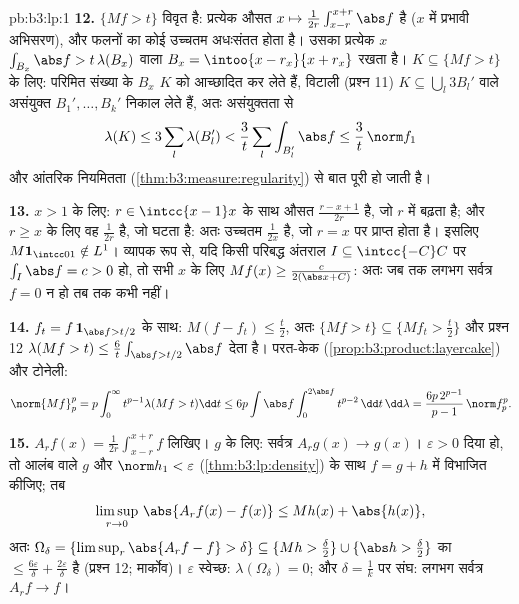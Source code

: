 \begin{solution}{pb:b3:lp:1}
\textbf{12.} $\{Mf > t\}$ विवृत है: प्रत्येक औसत $x \mapsto
\frac1{2r}\int_{x-r}^{x+r}\abs f$  है ($x$ में
प्रभावी अभिसरण), और  फलनों का कोई उच्चतम अधःसंतत होता है। उसका
प्रत्येक $x$ $\int_{B_x}\abs f >
t\,\lambda(B_x)$ वाला $B_x =
\intoo{x-r_x}{x+r_x}$ रखता है।  $K \subseteq \{Mf > t\}$ के लिए: परिमित
संख्या के $B_x$ $K$ को आच्छादित कर लेते हैं, विटाली (प्रश्न 11)
$K \subseteq
\bigcup_l3B_l'$ वाले असंयुक्त $B_1', \dots, B_k'$ निकाल लेते हैं, अतः असंयुक्तता से
\[
\lambda(K) \leq 3\sum_l\lambda(B_l') <
\frac3t\sum_l\int_{B_l'}\abs f \leq \frac3t\,\norm f_1
\]
और आंतरिक नियमितता (\cref{thm:b3:measure:regularity}) से बात पूरी हो जाती है।

\textbf{13.} $x > 1$ के लिए: $r \in \intcc{x-1}x$ के साथ औसत $\frac{r - x + 1}{2r}$ है, जो $r$ में
बढ़ता है; और $r
\geq x$ के लिए वह $\frac1{2r}$ है, जो घटता है: अतः उच्चतम $\frac1{2x}$
है, जो $r = x$ पर प्राप्त होता है। इसलिए $M\mathbf 1_{\intcc01}
\notin L^1$। व्यापक रूप से, यदि
किसी परिबद्ध अंतराल $I \subseteq \intcc{-C}C$ पर $\int_I\abs f = c > 0$ हो, तो सभी $x$ के लिए $Mf(x) \geq
\frac{c}{2(\abs x + C)}$:
अतः जब तक लगभग सर्वत्र $f = 0$ न हो तब तक कभी  नहीं।

\textbf{14.} $f_t = f\,\mathbf 1_{\abs f > t/2}$ के साथ: $M(f - f_t) \leq \frac t2$, अतः $\{Mf > t\} \subseteq \{Mf_t
> \frac t2\}$ और प्रश्न 12 $\lambda(Mf > t) \leq
\frac6t\int_{\abs f > t/2}\abs f$ देता
है। परत-केक (\cref{prop:b3:product:layercake}) और टोनेली:
\[
\norm{Mf}_p^p = p\int_0^\infty t^{p-1}\lambda(Mf > t)\dd t
\leq 6p\int\abs f\int_0^{2\abs f}t^{p-2}\,\dd t\,\dd\lambda
= \frac{6p\,2^{p-1}}{p-1}\,\norm f_p^p .
\]

\textbf{15.} $A_rf(x) = \frac1{2r}\int_{x-r}^{x+r}f$ लिखिए।  $g$ के लिए: सर्वत्र $A_rg(x) \to g(x)$। $\varepsilon > 0$
दिया हो, तो  आलंब वाले  $g$ और $\norm h_1 < \varepsilon$ (\cref{thm:b3:lp:density}) के साथ $f = g + h$
में विभाजित कीजिए; तब
\[
\limsup_{r\to0}\,\abs{A_rf(x) - f(x)} \leq Mh(x) +
\abs{h(x)},
\]
अतः $\Omega_\delta = \{\limsup_r\abs{A_rf - f} > \delta\}
\subseteq \{Mh > \tfrac\delta2\} \cup \{\abs h >
\tfrac\delta2\}$ का  $\leq \frac{6\varepsilon}\delta
+ \frac{2\varepsilon}\delta$ है (प्रश्न 12; मार्कोव)। $\varepsilon$ स्वेच्छ: $\lambda(\Omega_\delta) = 0$;
और $\delta = \frac1k$ पर संघ: लगभग सर्वत्र $A_rf \to f$।


\end{solution}
